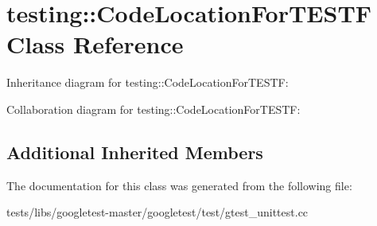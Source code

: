 \hypertarget{classtesting_1_1CodeLocationForTESTF}{}\section{testing\+:\+:Code\+Location\+For\+T\+E\+S\+TF Class Reference}
\label{classtesting_1_1CodeLocationForTESTF}


Inheritance diagram for testing\+:\+:Code\+Location\+For\+T\+E\+S\+TF\+:


Collaboration diagram for testing\+:\+:Code\+Location\+For\+T\+E\+S\+TF\+:
\subsection*{Additional Inherited Members}


The documentation for this class was generated from the following file\+:\begin{DoxyCompactItemize}
\item 
tests/libs/googletest-\/master/googletest/test/gtest\+\_\+unittest.\+cc\end{DoxyCompactItemize}
